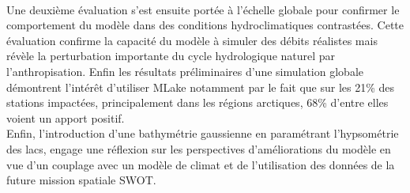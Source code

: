 \documentclass[a4paper,12pt,twoside]{StyleThese}
\begin{document}
\begin{vcenterpage}
\\
Une deuxième évaluation s'est ensuite portée à l'échelle globale pour confirmer le comportement du modèle dans des conditions hydroclimatiques contrastées. Cette évaluation confirme la capacité du modèle à simuler des débits réalistes mais révèle la perturbation importante du cycle hydrologique naturel par l'anthropisation. Enfin les résultats préliminaires d'une simulation globale démontrent l'intérêt d'utiliser MLake notamment par le fait que sur les 21\% des stations impactées, principalement dans les régions arctiques, 68\% d'entre elles voient un apport positif.
\\
Enfin, l'introduction d'une bathymétrie gaussienne en paramétrant l'hypsométrie des lacs, engage une réflexion sur les perspectives d'améliorations du modèle en vue d'un couplage avec un modèle de climat et de l'utilisation des données de la future mission spatiale SWOT.


\end{vcenterpage}
\end{document}
